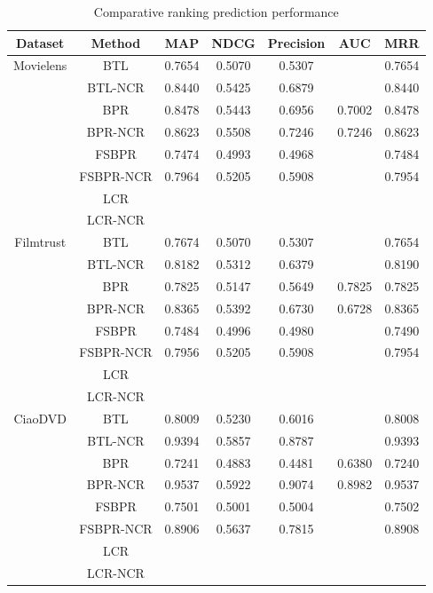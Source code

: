 \documentclass[letterpaper]{article} %
\begin{document}
\begin{table}[htp]
\tiny
\caption{Comparative ranking prediction performance}
\begin{center}
\begin{tabular}{|c|c|c|c|c|c|c|}
\hline
Dataset & Method & MAP & NDCG & Precision & AUC & MRR \\\hline
\multirow{6}{*}{Movielens} & BTL &0.7654 &0.5070 &0.5307 & &0.7654 \\\cline{2-7}
 & BTL-NCR &0.8440 &0.5425 &0.6879 & &0.8440 \\\cline{2-7}
 & BPR &0.8478 &0.5443 &0.6956 &0.7002 &0.8478 \\\cline{2-7}
 & BPR-NCR &0.8623 &0.5508 &0.7246 &0.7246 &0.8623 \\\cline{2-7}
 & FSBPR &0.7474 &0.4993 &0.4968 & &0.7484 \\\cline{2-7}
  & FSBPR-NCR &0.7964 &0.5205 &0.5908 & &0.7954 \\\cline{2-7}
   & LCR & & & & & \\\cline{2-7}
 & LCR-NCR & & & & & \\\hline
\multirow{6}{*}{Filmtrust} & BTL &0.7674 &0.5070 &0.5307 & &0.7654 \\\cline{2-7}
 & BTL-NCR &0.8182 &0.5312 &0.6379 & &0.8190 \\\cline{2-7}
 & BPR &0.7825 &0.5147 &0.5649 &0.7825 &0.7825  \\\cline{2-7}
 & BPR-NCR &0.8365 &0.5392 &0.6730 &0.6728 &0.8365 \\\cline{2-7}
 & FSBPR &0.7484 &0.4996 &0.4980 & &0.7490 \\\cline{2-7}
  & FSBPR-NCR &0.7956 &0.5205 &0.5908 & &0.7954 \\\cline{2-7}
   & LCR & & & & & \\\cline{2-7}
 & LCR-NCR & & & & & \\\hline
\multirow{6}{*}{CiaoDVD} & BTL &0.8009 &0.5230 &0.6016 & &0.8008 \\\cline{2-7}
 & BTL-NCR &0.9394 &0.5857 &0.8787 & &0.9393 \\\cline{2-7}
 & BPR &0.7241 &0.4883 &0.4481 &0.6380 &0.7240 \\\cline{2-7}
 & BPR-NCR &0.9537 &0.5922 &0.9074 &0.8982 &0.9537 \\\cline{2-7}
 & FSBPR &0.7501 &0.5001 &0.5004 & &0.7502 \\\cline{2-7}
  & FSBPR-NCR &0.8906 &0.5637 &0.7815 & &0.8908 \\\cline{2-7}
   & LCR & & & & & \\\cline{2-7}
 & LCR-NCR & & & & & \\\hline
\end{tabular}
\end{center}
\label{tab:rankingresult}
\end{table}%
\end{document}
